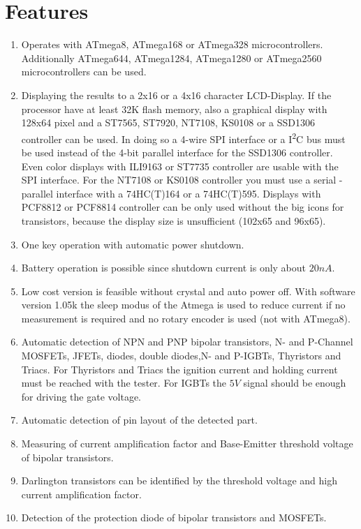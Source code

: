 \chapter{Features}
\label{sec:features}
\begin{enumerate}
\item Operates with ATmega8, ATmega168 or ATmega328 microcontrollers. Additionally ATmega644, ATmega1284,
ATmega1280 or ATmega2560 microcontrollers can be used.
\item Displaying the results to a 2x16 or a 4x16 character LCD-Display.
 If the processor have at least 32K flash memory, also a graphical display with 128x64 pixel and
a ST7565, ST7920, NT7108, KS0108 or a SSD1306 controller can be used.
In doing so a 4-wire SPI interface or a I\textsuperscript{2}C bus must be used instead of the 4-bit parallel interface for
the SSD1306 controller.
Even color displays with ILI9163 or ST7735 controller are usable with the SPI interface.
For the NT7108 or KS0108 controller you must use a serial - parallel interface with a 74HC(T)164 or a 74HC(T)595.
Displays with PCF8812 or PCF8814 controller can be only used without the big icons for transistors, because the display size is
unsufficient (102x65 and 96x65).
\item One key operation with automatic power shutdown.
\item Battery operation is possible since shutdown current is only about \(20nA\).
\item Low cost version is feasible without crystal and auto power off.
With software version 1.05k the sleep modus of the Atmega is used to reduce current if
no measurement is required and no rotary encoder is used (not with ATmega8).
\item Automatic detection of NPN and PNP bipolar transistors, N- and P-Channel MOSFETs, JFETs,
diodes, double diodes,N- and P-IGBTs, Thyristors and Triacs.
For Thyristors and Triacs the ignition current and holding current must be reached with the tester.
For IGBTs the \(5V\) signal should be enough for driving the gate voltage.
\item Automatic detection of pin layout of the detected part.
\item Measuring of current amplification factor and Base-Emitter threshold voltage of bipolar transistors.
\item Darlington transistors can be identified by the threshold voltage and high current amplification factor.
\item Detection of the protection diode of bipolar transistors and MOSFETs.

\end{enumerate}
